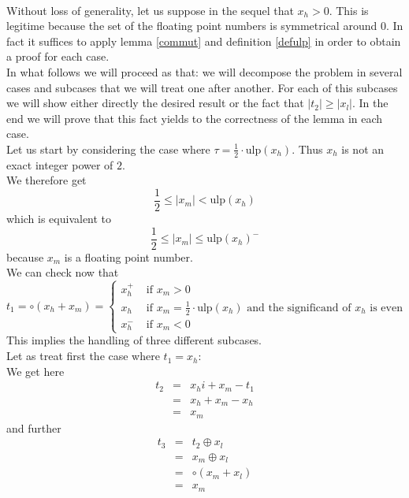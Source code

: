 \documentclass[a4paper,10pt,twoside]{article}
\newenvironment{proof}[1][Proof]{\begin{trivlist}
\item[\hskip \labelsep {\bfseries #1}]}{\end{trivlist}}
\newcommand{\hi}{\ensuremath{\mathit{h}}}
\newcommand{\mi}{\ensuremath{\mathit{m}}}
\newcommand{\lo}{\ensuremath{\mathit{l}}}
\newcommand{\mUlp}{\ensuremath{\mathrm{ulp}}}
\begin{document}
\begin{proof} ~ \\
Without loss of generality, let us suppose in the sequel that $x_\hi > 0$. This is legitime because the set of the 
floating point numbers is symmetrical around $0$. In fact it suffices to apply lemma \ref{commut} and 
definition \ref{defulp} in order to obtain a proof for each case.\\
In what follows we will proceed as that: we will decompose the problem in several cases and subcases that we will 
treat one after another. For each of this subcases we will show either directly the desired result or the fact that 
$\left \vert t_2 \right \vert \geq \left \vert x_\lo \right \vert$.
In the end we will prove that this fact yields to the correctness of the lemma in each case.\\
Let us start by considering the case where $\tau = \frac{1}{2} \cdot \mUlp\left( x_\hi \right)$. 
Thus $x_\hi$ is not an exact integer power of $2$.\\
We therefore get 
$$\frac{1}{2} \leq \left \vert x_\mi \right \vert < \mUlp\left( x_\hi \right)$$
which is equivalent to
$$\frac{1}{2} \leq \left \vert x_\mi \right \vert \leq \mUlp\left( x_\hi \right)^-$$
because $x_\mi$ is a floating point number.\\
We can check now that
$$t_1 = \circ \left( x_\hi + x_\mi \right) = \left \lbrace \begin{array}{ll} 
x_\hi^+ & \mbox{ if } x_\mi > 0 \\
x_\hi & \mbox{ if } x_\mi = \frac{1}{2} \cdot \mUlp\left( x_\hi \right) \mbox{ and the significand of } x_\hi \mbox{ is even} \\
x_\hi^- & \mbox{ if } x_\mi < 0
\end{array} \right.$$
This implies the handling of three different subcases. \\
Let as treat first the case where $t_1 = x_\hi$: \\
We get here
\begin{eqnarray*}
t_2 & = & x_hi + x_\mi - t_1 \\
& = & x_\hi + x_\mi - x_\hi \\
& = & x_\mi 
\end{eqnarray*}
and further
\begin{eqnarray*}
t_3 & = & t_2 \oplus x_\lo \\
& = & x_\mi \oplus x_\lo \\
& = & \circ \left( x_\mi + x_\lo \right) \\
& = & x_\mi 
\end{eqnarray*}

\end{proof}
\end{document}
